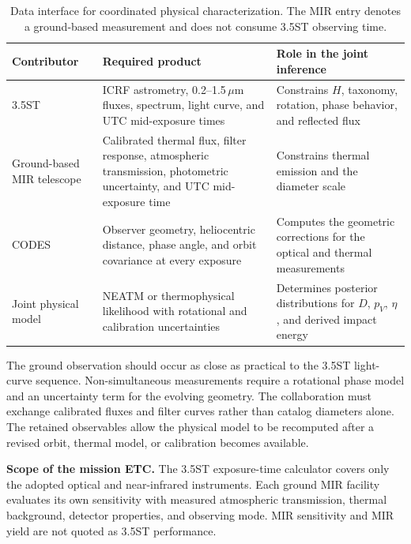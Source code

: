 \begin{table}[H]
\centering
\caption{Data interface for coordinated physical characterization. The
MIR entry denotes a ground-based measurement and does not consume 3.5ST
observing time.}
\begin{tabularx}{\textwidth}{@{}P{34mm}P{47mm}Y@{}}
\toprule
\textbf{\color{cGold}Contributor} &
\textbf{\color{cGold}Required product} &
\textbf{\color{cGold}Role in the joint inference}\\
\midrule
3.5ST &
ICRF astrometry, 0.2--1.5\,$\mu$m fluxes, spectrum, light curve, and UTC
mid-exposure times &
Constrains $H$, taxonomy, rotation, phase behavior, and reflected flux\\
Ground-based MIR telescope &
Calibrated thermal flux, filter response, atmospheric transmission,
photometric uncertainty, and UTC mid-exposure time &
Constrains thermal emission and the diameter scale\\
CODES &
Observer geometry, heliocentric distance, phase angle, and orbit covariance
at every exposure &
Computes the geometric corrections for the optical and thermal measurements\\
Joint physical model &
NEATM or thermophysical likelihood with rotational and calibration
uncertainties &
Determines posterior distributions for $D$, $p_V$, $\eta$, and derived impact
energy\\
\bottomrule
\end{tabularx}
\label{tab:ground-mir-interface}
\end{table}

The ground observation should occur as close as practical to the 3.5ST
light-curve sequence. Non-simultaneous measurements require a rotational
phase model and an uncertainty term for the evolving geometry. The collaboration
must exchange calibrated fluxes and filter curves rather than catalog
diameters alone. The retained observables allow the physical model to be
recomputed after a revised orbit, thermal model, or calibration becomes
available.

\begin{resultbox}
\textbf{\color{cTeal}Scope of the mission ETC.}
The 3.5ST exposure-time calculator covers only the adopted optical and
near-infrared instruments. Each ground MIR facility evaluates its own
sensitivity with measured atmospheric transmission, thermal background,
detector properties, and observing mode. MIR sensitivity and MIR yield are
not quoted as 3.5ST performance.
\end{resultbox}


